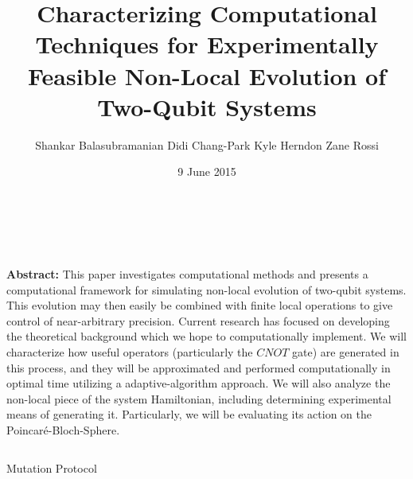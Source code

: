 \documentclass[14pt]{beamer}
\title{Characterizing Computational Techniques for Experimentally Feasible Non-Local Evolution of Two-Qubit Systems}
\author{Shankar Balasubramanian\hspace{1em} Didi Chang-Park\hspace{1em} Kyle Herndon\hspace{1em} Zane Rossi}
\institute{TJHSST Modern Physics and Optics Lab}
\date{9 June 2015}
\renewcommand{\maketitle}{%
	\begin{center}%
		\Huge\inserttitle\\[5mm]%
		\Large\insertauthor\\[5mm]%
		\Large\insertinstitute%
	\end{center}%
	\vspace*{-1.5ex}%
}
\begin{document}
\centering
	\begin{frame}{\maketitle}
	
					   {\bf{Abstract:}} This paper investigates computational methods and presents a computational framework for simulating non-local evolution of two-qubit systems. This evolution may then easily be combined with finite local operations to give control of near-arbitrary precision. Current research has focused on developing the theoretical background which we hope to computationally implement. We will characterize how useful operators (particularly the $CNOT$ gate) are generated in this process, and they will be approximated and performed computationally in optimal time utilizing a adaptive-algorithm approach. We will also analyze the non-local piece of the system Hamiltonian, including determining experimental means of generating it.  Particularly, we will be evaluating its action on the Poincar\'{e}-Bloch-Sphere.
\vfill

		\begin{columns}
			\begin{column}{.45\textwidth}
			
\begin{exampleblock}{Mutation Protocol}


\end{exampleblock}
\end{column}
\end{columns}
\end{frame}
\end{document}
